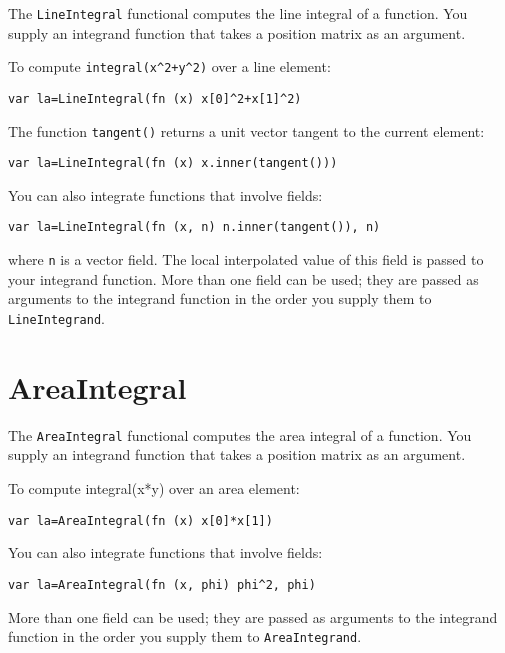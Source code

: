 The \texttt{LineIntegral} functional computes the line integral of a
function. You supply an integrand function that takes a position matrix
as an argument.

To compute \texttt{integral(x\^{}2+y\^{}2)} over a line element:

\begin{lstlisting}
var la=LineIntegral(fn (x) x[0]^2+x[1]^2)
\end{lstlisting}

The function \texttt{tangent()} returns a unit vector tangent to the
current element:

\begin{lstlisting}
var la=LineIntegral(fn (x) x.inner(tangent()))
\end{lstlisting}

You can also integrate functions that involve fields:

\begin{lstlisting}
var la=LineIntegral(fn (x, n) n.inner(tangent()), n)
\end{lstlisting}

where \texttt{n} is a vector field. The local interpolated value of this
field is passed to your integrand function. More than one field can be
used; they are passed as arguments to the integrand function in the
order you supply them to \texttt{LineIntegrand}.

\hypertarget{areaintegral}{%
\section{AreaIntegral}\label{areaintegral}}

The \texttt{AreaIntegral} functional computes the area integral of a
function. You supply an integrand function that takes a position matrix
as an argument.

To compute integral(x*y) over an area element:

\begin{lstlisting}
var la=AreaIntegral(fn (x) x[0]*x[1])
\end{lstlisting}

You can also integrate functions that involve fields:

\begin{lstlisting}
var la=AreaIntegral(fn (x, phi) phi^2, phi)
\end{lstlisting}

More than one field can be used; they are passed as arguments to the
integrand function in the order you supply them to
\texttt{AreaIntegrand}.

